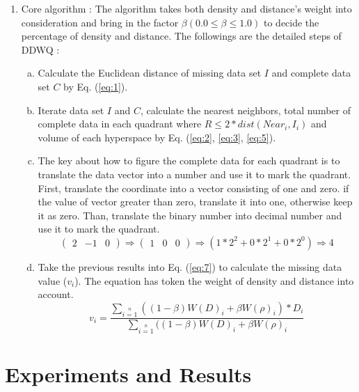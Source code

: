 \documentclass[print]{jicspack}
\begin{document}
\begin{enumerate}[(1)]
\item Core algorithm : The algorithm takes both density and distance's weight into consideration and bring in the factor $\beta (0.0 \leq \beta \leq 1.0)$ to decide the percentage of density and distance.  The followings are the detailed steps of DDWQ :
\begin{enumerate}[a.]
  \item Calculate the Euclidean distance of missing data set $I$ and complete data set $C$ by Eq. (\ref{eq:1}).
  \item Iterate data set $I$ and $C$, calculate the nearest neighbors, total number of complete data in each quadrant where $R \leq 2 * dist(Near_i, I_i)$ and volume of each hyperspace by Eq. (\ref{eq:2}, \ref{eq:3}, \ref{eq:5}).
  \item The key about how to figure the complete data for each quadrant is to translate the data vector into a number and use it to mark the quadrant. First, translate the coordinate into a vector consisting of one and zero. if the value of vector greater than zero, translate it into one, otherwise keep it as zero. Than, translate the binary number into decimal number and use it to mark the quadrant.
  \begin{equation}
  \label{eq:6}
  \begin{pmatrix} 2& -1& 0\end{pmatrix}\Rightarrow \begin{pmatrix} 1& 0& 0\end{pmatrix} \Rightarrow (1*2^2 + 0*2^1+ 0*2^0) \Rightarrow 4
  \end{equation}
  \item Take the previous results into Eq. (\ref{eq:7}) to calculate the missing data value ($v_i$). The equation has token the weight of density and distance into account.
  \begin{equation}
  \label{eq:7}
  v_i = \frac{\sum\limits_{i=1}\limits^{n}((1-\beta)W(D)_i + \beta W(\rho)_i) * D_i}{\sum\limits_{i=1}\limits^{n}((1-\beta)W(D)_i + \beta W(\rho)_i}
  \end{equation}
\end{enumerate}
\end{enumerate}

\section{Experiments and Results}
\end{document}
